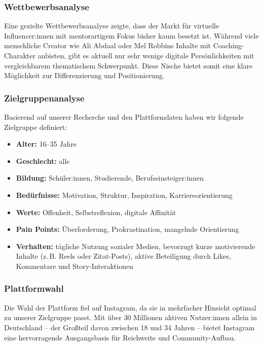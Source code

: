 \documentclass[a4paper,12pt]{article}
\begin{document}
\subsubsection*{Wettbewerbsanalyse}

Eine gezielte Wettbewerbsanalyse zeigte, dass der Markt für virtuelle Influencer:innen mit mentorartigem Fokus bisher kaum besetzt ist. Während viele menschliche Creator wie Ali Abdaal oder Mel Robbins Inhalte mit Coaching-Charakter anbieten, gibt es aktuell nur sehr wenige digitale Persönlichkeiten mit vergleichbarem thematischem Schwerpunkt. Diese Nische bietet somit eine klare Möglichkeit zur Differenzierung und Positionierung.

\subsubsection*{Zielgruppenanalyse}

Basierend auf unserer Recherche und den Plattformdaten haben wir folgende Zielgruppe definiert:

\begin{itemize}
    \item \textbf{Alter:} 16–35 Jahre
    \item \textbf{Geschlecht:} alle
    \item \textbf{Bildung:} Schüler:innen, Studierende, Berufseinsteiger:innen
    \item \textbf{Bedürfnisse:} Motivation, Struktur, Inspiration, Karriereorientierung
    \item \textbf{Werte:} Offenheit, Selbstreflexion, digitale Affinität
    \item \textbf{Pain Points:} Überforderung, Prokrastination, mangelnde Orientierung
    \item \textbf{Verhalten:} tägliche Nutzung sozialer Medien, bevorzugt kurze motivierende Inhalte (z.\,B. Reels oder Zitat-Posts), aktive Beteiligung durch Likes, Kommentare und Story-Interaktionen
\end{itemize}

\subsubsection*{Plattformwahl}

Die Wahl der Plattform fiel auf Instagram, da sie in mehrfacher Hinsicht optimal zu unserer Zielgruppe passt. Mit über 30 Millionen aktiven Nutzer:innen allein in Deutschland – der Großteil davon zwischen 18 und 34 Jahren – bietet Instagram eine hervorragende Ausgangsbasis für Reichweite und Community-Aufbau.
\end{document}
